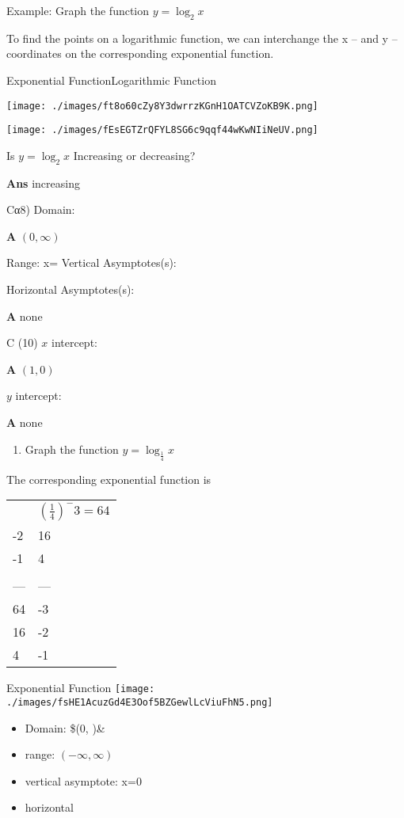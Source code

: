 \documentclass{book}
\begin{document}
Example: Graph the function \(y=\log_{2}x\)

To find the points on a logarithmic function, we can interchange the x
-- and y -- coordinates on the corresponding exponential function.

Exponential FunctionLogarithmic Function

\texttt{[image: ./images/ft8o60cZy8Y3dwrrzKGnH1OATCVZoKB9K.png]}

\texttt{[image: ./images/fEsEGTZrQFYL8SG6c9qqf44wKwNIiNeUV.png]}

Is \(y=\log_{2}x\) Increasing or decreasing?

\textbf{Ans} increasing

Cα8) Domain:

\textbf{A} \((0,\infty)\)

Range: x= Vertical Asymptotes(s):

Horizontal Asymptotes(s):

\textbf{A} none

C (10) \(x\) intercept:

\textbf{A} \((1,0)\)

\(y\) intercept:

\textbf{A} none

\begin{enumerate}
\def\labelenumi{\arabic{enumi}.}
\setcounter{enumi}{10}
\tightlist
\item
  Graph the function \(y=\log_{\frac14}x\)
\end{enumerate}

The corresponding exponential function is

\begin{longtable}[]{@{}ll@{}}
\toprule\noalign{}
\endhead
\bottomrule\noalign{}
\endlastfoot
-3 & \((\frac{1}{4})^-3=64\) \\
-2 & 16 \\
-1 & 4 \\
& \\
--- & --- \\
64 & -3 \\
16 & -2 \\
4 & -1 \\
\end{longtable}

Exponential Function
\texttt{[image: ./images/fsHE1AcuzGd4E3Oof5BZGewlLcViuFhN5.png]}

\begin{itemize}
\tightlist
\item
  Domain: \$(0, \infty)\&
\item
  range: \((-\infty,\infty)\)
\item
  vertical asymptote: x=0
\item
  horizontal
\end{itemize}
\end{document}
